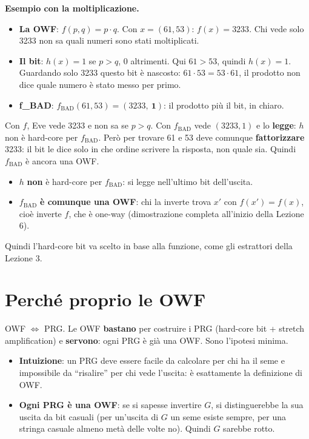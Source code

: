 \begin{esempio}
\textbf{Esempio con la moltiplicazione.}
\begin{itemize}
  \item \textbf{La OWF}: \(f(p, q) = p \cdot q\). Con \(x = (61, 53)\): \(f(x) = 3233\). Chi vede solo 3233 non sa quali numeri sono stati moltiplicati.
  \item \textbf{Il bit}: \(h(x) = 1\) se \(p > q\), 0 altrimenti. Qui \(61 > 53\), quindi \(h(x) = 1\). Guardando solo 3233 questo bit è nascosto: \(61 \cdot 53 = 53 \cdot 61\), il prodotto non dice quale numero è stato messo per primo.
  \item \textbf{f\_BAD}: \(f_{\text{BAD}}(61, 53) = (3233,\ \mathbf{1})\): il prodotto più il bit, in chiaro.
\end{itemize}
Con \(f\), Eve vede 3233 e non sa se \(p > q\). Con \(f_{\text{BAD}}\) vede \((3233, 1)\) e lo \textbf{legge}: \(h\) non è hard-core per \(f_{\text{BAD}}\). Però per trovare 61 e 53 deve comunque \textbf{fattorizzare} 3233: il bit le dice solo in che ordine scrivere la risposta, non quale sia. Quindi \(f_{\text{BAD}}\) è ancora una OWF.
\end{esempio}
\begin{itemize}
  \item \(h\) \textbf{non} è hard-core per \(f_{\text{BAD}}\): si legge nell'ultimo bit dell'uscita.
  \item \(f_{\text{BAD}}\) \textbf{è comunque una OWF}: chi la inverte trova \(x'\) con \(f(x') = f(x)\), cioè inverte \(f\), che è one-way (dimostrazione completa all'inizio della Lezione 6).
\end{itemize}
Quindi l'hard-core bit va scelto in base alla funzione, come gli estrattori della Lezione 3.

\section{Perché proprio le OWF}

\begin{inbreve}
OWF \(\Leftrightarrow\) PRG. Le OWF \textbf{bastano} per costruire i PRG (hard-core bit + stretch amplification) e \textbf{servono}: ogni PRG è già una OWF. Sono l'ipotesi minima.
\end{inbreve}

\begin{itemize}
  \item \textbf{Intuizione}: un PRG deve essere facile da calcolare per chi ha il seme e impossibile da ``risalire'' per chi vede l'uscita: è esattamente la definizione di OWF.
  \item \textbf{Ogni PRG è una OWF}: se si sapesse invertire \(G\), si distinguerebbe la sua uscita da bit casuali (per un'uscita di \(G\) un seme esiste sempre, per una stringa casuale almeno metà delle volte no). Quindi \(G\) sarebbe rotto.
\end{itemize}
